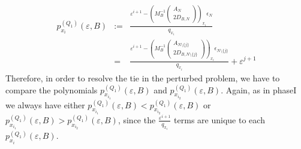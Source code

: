 \documentclass[a4paper]{article}
\newcommand{\px}[3]{\ensuremath{p_{x_{#1}}^{(#2)}(\varepsilon, #3)}}
\begin{document}
\begin{eqnarray}
\label{def:p_x_i_Q_1}
\px{i}{Q_{1}}{B} &:=&
  \frac{\varepsilon^{i+1} -
         \left(M_{B}^{-1}
           \left(\begin{array}{c}
                    A_{N}  \\
	            \hline
	            2D_{B, N}
	         \end{array}
	   \right)
         \right)_{x_{i}}\epsilon_{N}}{q_{x_{i}}} \\
  &=&
    \frac{\varepsilon^{i+1} -
         \left(M_{B}^{-1}
           \left(\begin{array}{c}
                    A_{N \setminus \{j\}}  \\
	            \hline
	            2D_{B, N \setminus \{j\}}
	         \end{array}
	   \right)
         \right)_{x_{i}}\epsilon_{N \setminus \{j\}}}{q_{x_{i}}}
	 + \varepsilon^{j+1}
\end{eqnarray}
Therefore, in order to resolve the tie in the perturbed problem, we have 
to compare the polynomials \px{i_{1}}{Q_{1}}{B} and \px{i_{2}}{Q_{1}}{B}.
Again, as in phaseI we always have either
$\px{i_{1}}{Q_{1}}{B} < \px{i_{2}}{Q_{1}}{B}$ or
$\px{i_{1}}{Q_{1}}{B} > \px{i_{2}}{Q_{1}}{B}$, since the
$\frac{\varepsilon^{i+1}}{q_{x_{i}}}$ terms are unique to each
\px{i}{Q_{1}}{B}.
\end{document}

